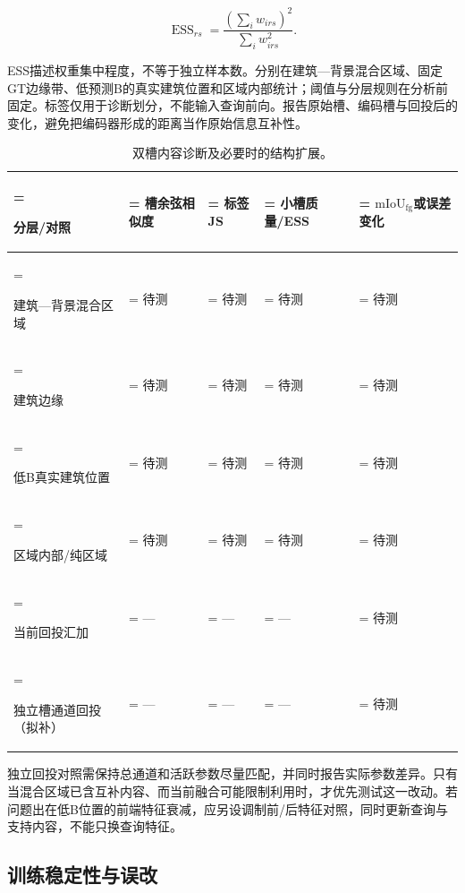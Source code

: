 \documentclass[UTF8,a4paper,zihao=-4,fontset=none]{ctexart}
\begin{document}
\begin{equation}
\label{eq:14}
\operatorname{ESS}_{rs}=\frac{\left(\sum_i w_{irs}\right)^2}{\sum_i w_{irs}^2}.
\end{equation}

ESS描述权重集中程度，不等于独立样本数。分别在建筑—背景混合区域、固定GT边缘带、低预测B的真实建筑位置和区域内部统计；阈值与分层规则在分析前固定。标签仅用于诊断划分，不能输入查询前向。报告原始槽、编码槽与回投后的变化，避免把编码器形成的距离当作原始信息互补性。

\begin{table}[!htbp]
\centering
\renewcommand{\thetable}{5}
\caption{双槽内容诊断及必要时的结构扩展。}
\label{tab:5}
\small
\setlength{\tabcolsep}{3.5pt}
\renewcommand{\arraystretch}{1.3}
\begin{tabularx}{\linewidth}{@{}>{\hsize=1.500000\hsize\linewidth=\hsize\raggedright\arraybackslash}X>{\hsize=0.850000\hsize\linewidth=\hsize\centering\arraybackslash}X>{\hsize=0.700000\hsize\linewidth=\hsize\centering\arraybackslash}X>{\hsize=0.900000\hsize\linewidth=\hsize\centering\arraybackslash}X>{\hsize=1.050000\hsize\linewidth=\hsize\centering\arraybackslash}X@{}}
\toprule
\textbf{分层/对照} & \textbf{槽余弦相似度} & \textbf{标签JS} & \textbf{小槽质量/ESS} & \textbf{\(\mathrm{mIoU}_{\mathrm{fg}}\)或误差变化} \\
\midrule
建筑—背景混合区域 & 待测 & 待测 & 待测 & 待测 \\
建筑边缘 & 待测 & 待测 & 待测 & 待测 \\
低B真实建筑位置 & 待测 & 待测 & 待测 & 待测 \\
区域内部/纯区域 & 待测 & 待测 & 待测 & 待测 \\
当前回投汇加 & — & — & — & 待测 \\
独立槽通道回投（拟补） & — & — & — & 待测 \\
\bottomrule
\end{tabularx}
\end{table}

独立回投对照需保持总通道和活跃参数尽量匹配，并同时报告实际参数差异。只有当混合区域已含互补内容、而当前融合可能限制利用时，才优先测试这一改动。若问题出在低B位置的前端特征衰减，应另设调制前/后特征对照，同时更新查询与支持内容，不能只换查询特征。

\FloatBarrier

\subsection{训练稳定性与误改}
\end{document}
